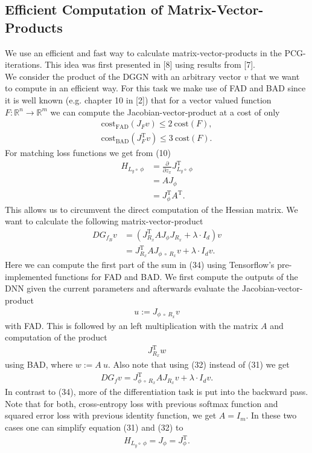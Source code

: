 \documentclass[conference]{IEEEtran}
\begin{document}
	\subsection{Efficient Computation of Matrix-Vector-Products}
	\noindent
	We use an efficient and fast way to calculate matrix-vector-products in the PCG-iterations. This idea was first presented in [8] using results from [7].\\
	We consider the product of the DGGN with an arbitrary vector $v$ that we want to compute in an efficient way.
	For this task we make use of FAD and BAD since it is well known (e.g. chapter 10 in [2]) that for a vector valued function $F:\mathbb{R}^{n}\rightarrow\mathbb{R}^{m}$ we can compute the Jacobian-vector-product at a cost of only
	\begin{align}
	\mathrm{cost}_{\text{FAD}}(J_{F}v)\leq 2\:\mathrm{cost}(F),\\
	\mathrm{cost}_{\text{BAD}}(J_{F}^{\mathrm{T}}v)\leq 3\:\mathrm{cost}(F).
	\end{align}
	For matching loss functions we get from (10)
	\begin{align}
	H_{L_{y}\circ\:\phi} &= \frac{\partial}{\partial z_{x}}J_{L_{y}\circ\:\phi}^{\mathrm{T}}\\
	&= AJ_{\phi} \\
	&= J_{\phi}^{\mathrm{T}}A^{\mathrm{T}}.
	\end{align}
	This allows us to circumvent the direct computation of the Hessian matrix. We want to calculate the following matrix-vector-product
	\begin{align}
	DG_{f_{B}}v &=  \left(J_{R_{x}}^{\mathrm{T}}AJ_{\phi}J_{R_{x}} + \lambda\cdot I_{d}\right)v\\
	&= J_{R_{x}}^{\mathrm{T}}AJ_{\phi\:\circ\: R _{x}}v + \lambda\cdot I_{d}v.
	\end{align}
	Here we can compute the first part of the sum in (34) using Tensorflow's pre-implemented functions for FAD and BAD. We first compute the outputs of the DNN given the current parameters and afterwards evaluate the Jacobian-vector-product
	\begin{align}
	u := J_{\phi\:\circ\: R _{x}}v
	\end{align}
	with FAD. This is followed by an left multiplication with the matrix $A$ and computation of the product
	\begin{align}
	J_{R_{x}}^{\mathrm{T}}w
	\end{align}
	using BAD, where $w := A\:u$. Also note that using (32) instead of (31) we get
	\begin{align}
	DG_{f}v  = J_{\phi\:\circ\:R _{x}}^{\mathrm{T}}AJ_{R _{x}}v + \lambda\cdot I_{d}v.
	\end{align}
	In contrast to (34), more of the differentiation task is put into the backward pass.\\
	Note that for both, cross-entropy loss with previous softmax function and squared error loss with previous identity function, we get $A = I_{m}$. In these two cases one can simplify equation (31) and (32) to
	\begin{align}
	H_{L_{y}\circ\:\phi} = J_{\phi} = J_{\phi}^{\mathrm{T}}.
	\end{align}
\end{document}
